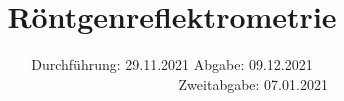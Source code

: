 
\setlength\parindent{0pt}
\subject{V44}
\title{Röntgenreflektrometrie}
\date{%
  Durchführung: 29.11.2021
  \hspace{3em}
  Abgabe: 09.12.2021 \\
  \textcolor{white}{Durchführung: 29.11.2021} \hspace{3em} Zweitabgabe: 07.01.2021
}



\thispagestyle{empty}
\tableofcontents
\newpage







\newpage
\nocite{*}
\printbibliography
\appendix


